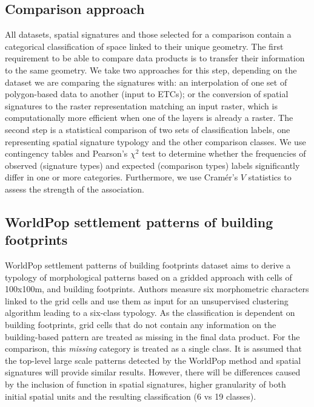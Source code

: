 \documentclass[fleqn,10pt]{wlscirep}
\begin{document}
\subsection*{Comparison approach}
All datasets, spatial signatures and those selected for a comparison contain a
categorical classification of space linked to their unique geometry. The first
requirement to be able to compare data products is to transfer their
information to the same geometry. We take two approaches for this step,
depending on the dataset we are comparing the signatures with:
an interpolation of one set of polygon-based data to another (input to ETCs);
or the conversion of
spatial signatures to the raster representation matching an input raster,
which is computationally more efficient when one of the layers is already a raster. The second
step is a statistical comparison of two sets of classification labels, one representing
spatial signature typology and the other comparison classes. We use contingency tables
and Pearson's $\chi^{2}$ test to determine whether the frequencies of observed
(signature types) and expected (comparison types) labels significantly differ in one or
more categories. Furthermore, we use Cramér's $V$ statistics\cite{cramer2016mathematical} to assess the strength of
the association.

\subsection*{WorldPop settlement patterns of building footprints}
WorldPop settlement patterns of building footprints dataset aims to derive a typology of
morphological patterns based on a gridded approach with cells of
100x100m, and building footprints. Authors measure six morphometric characters
linked to the grid cells and use them as input for an unsupervised clustering
algorithm leading to a six-class typology.
As the classification is dependent on building footprints, grid cells that do
not contain any information on the building-based pattern are treated as missing in the
final data product. For the comparison, this \textit{missing}
category is treated as a single class. It is assumed that the top-level large scale
patterns detected by the WorldPop method and spatial signatures will provide similar
results. However, there will be differences caused by the inclusion of function in spatial
signatures, higher granularity of both initial spatial units and the resulting
classification (6 vs 19 classes).
\end{document}
